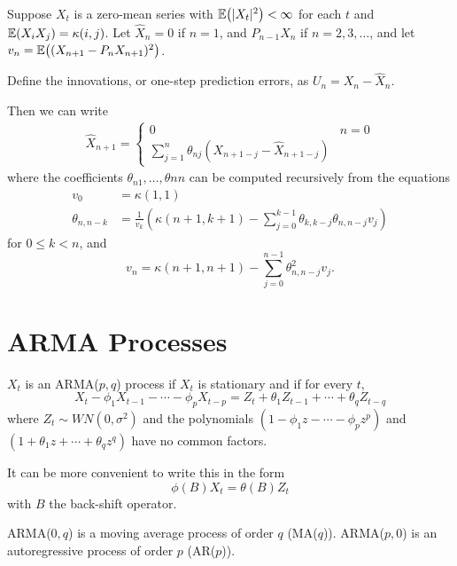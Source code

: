 \begin{thm}
  \label{defn:stationary_processes:2}
  Suppose $X_{t}$ is a zero-mean series with $\E{|X_{t}|^{2}} <
  \infty$ for each $t$ and $\E{X_{i} X_{j}} = \kappa(i, j)$.
  Let $\hat X_{n} = 0$ if $n = 1$, and $P_{n-1} X_{n}$ if $n = 2, 3,
  \dots$, and let $v_{n} = \E{(X_{n+1} - P_{n} X_{n+1})^{2}}$.

  Define the innovations, or one-step prediction errors, as $U_{n} =
  X_{n} - \hat X_{n}$.

  Then we can write
  \begin{align}
    \label{eq:16}
    \hat X_{n+1} =
    \begin{cases}
      0 & n = 0 \\
      \sum_{j=1}^{n} \theta_{nj}(X_{n+1-j} - \hat X_{n+1 - j})
    \end{cases}
  \end{align}
  where the coefficients $\theta_{n1}, \dots, \theta{nn}$ can be
  computed recursively from the equations
  \begin{align}
    \label{eq:17}
    v_{0} &= \kappa(1, 1) \\
    \theta_{n, n-k} &= \frac{1}{v_{k}}(\kappa(n+1, k+1) -
    \sum_{j=0}^{k-1} \theta_{k, k-j} \theta_{n, n-j} v_{j})
  \end{align}  for $0 \leq k < n$, and
  \begin{equation}
    \label{eq:18}
    v_{n} = \kappa(n+1, n+1) - \sum_{j=0}^{n-1} \theta^{2}_{n, n-j} v_{j}.
  \end{equation}
\end{thm}

\section{\textsc{ARMA} Processes}
\label{sec:arma-processes}

\begin{defn}
  \label{defn:arma_processes:1}
  $X_{t}$ is an \textsc{ARMA}($p, q$) process if $X_{t}$ is stationary and if
  for every $t$,
  \begin{equation}
    \label{eq:14}
    X_{t} - \phi_{1} X_{t-1} - \cdots - \phi_{p} X_{t-p} = Z_{t} +
    \theta_{1} Z_{t-1} + \cdots + \theta_{q} Z_{t-q}
  \end{equation} where $Z_{t} \sim WN(0, \sigma^{2})$  and the
  polynomials $(1 - \phi_{1}z - \cdots - \phi_{p} z^{p})$ and $(1 +
  \theta_{1} z + \cdots + \theta_{q} z^{q})$ have no common factors.

  It can be more convenient to write this in the form
  \begin{equation}
    \label{eq:19}
    \phi(B) X_{t} = \theta(B) Z_{t}
  \end{equation}
  with $B$ the back-shift operator.

  \textsc{ARMA}($0, q$) is a moving average process of order $q$ (MA($q$)).
  \textsc{ARMA}($p, 0$) is an autoregressive process of order $p$ (AR($p$)).
\end{defn}

